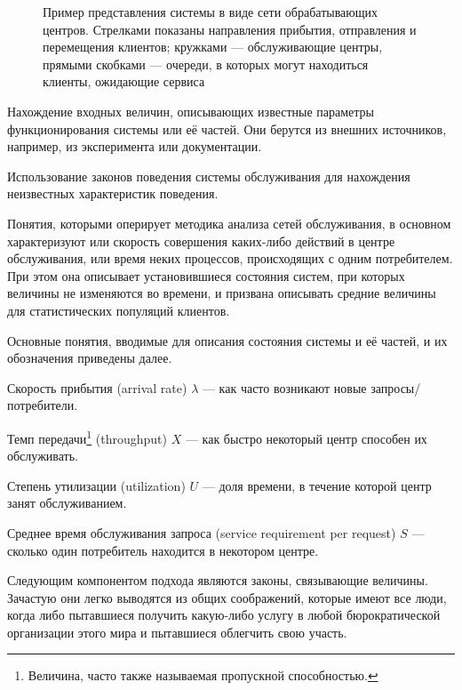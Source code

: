 \begin{enumerate*}
\begin{figure}[htb]
\begin{tikzpicture}[>=latex, node distance = 2cm, font=\small]
    \end{tikzpicture}
    \caption[Пример представления системы в виде сети обрабатывающих центров]{Пример представления системы в виде сети обрабатывающих центров. Стрелками показаны направления прибытия, отправления и перемещения клиентов; кружками --- обслуживающие центры, прямыми скобками --- очереди, в которых могут находиться клиенты, ожидающие сервиса}
    \label{fig:qsp}
\end{figure}


\item Нахождение входных величин, описывающих известные параметры функционирования системы или её частей. Они берутся из внешних источников, например, из эксперимента или документации.

\item Использование законов поведения системы обслуживания для нахождения неизвестных характеристик поведения.
\end{enumerate*}

Понятия, которыми оперирует методика анализа сетей обслуживания, в основном характеризуют или скорость совершения каких-либо действий в центре обслуживания, или время неких процессов, происходящих с одним потребителем. При этом она описывает установившиеся состояния систем, при которых величины не изменяются во времени, и призвана описывать средние величины для статистических популяций клиентов.

Основные понятия, вводимые для описания состояния системы и её частей, и их обозначения приведены далее.

\begin{itemize*}
\item 
Скорость прибытия (\abbr arrival rate) $\lambda$ --- как часто возникают новые запросы/потребители.

\item 
Темп передачи\footnote{Величина, часто также называемая пропускной способностью.} (\abbr throughput) $X$ --- как быстро некоторый центр способен их обслуживать.

\item 
Степень утилизации (\abbr utilization) $U$ --- доля времени, в течение которой центр занят обслуживанием.

\item 
Среднее время обслуживания запроса (\abbr service requirement per request) $S$ --- сколько один потребитель находится в некотором центре.
\end{itemize*}

Следующим компонентом подхода являются законы, связывающие величины. Зачастую  они легко выводятся из общих соображений, которые имеют все люди, когда либо пытавшиеся получить какую-либо услугу в любой бюрократической организации этого мира и пытавшиеся облегчить свою участь.

